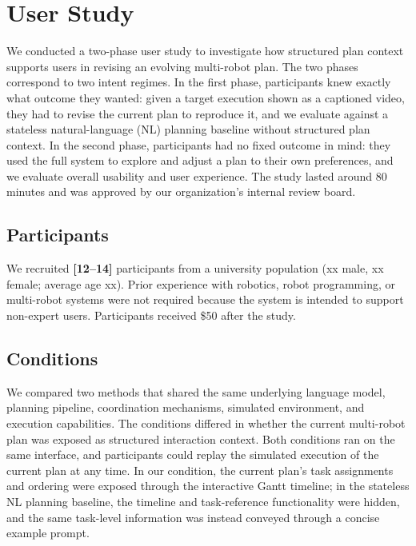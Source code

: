 \section{User Study}
\label{sec:user-study}


We conducted a two-phase user study to investigate how structured plan context supports users in revising an evolving multi-robot plan.
The two phases correspond to two intent regimes.
In the first phase, participants knew exactly what outcome they wanted: given a target execution shown as a captioned video, they had to revise the current plan to reproduce it, and we evaluate \oursystem{} against a stateless natural-language (NL) planning baseline without structured plan context.
In the second phase, participants had no fixed outcome in mind: they used the full system to explore and adjust a plan to their own preferences, and we evaluate overall usability and user experience.
The study lasted around 80 minutes and was approved by our organization's internal review board.

\subsection{Participants}

We recruited \textbf{[12--14]} participants from a university population (xx male, xx female; average age xx).
Prior experience with robotics, robot programming, or multi-robot systems were not required because the system is intended to support non-expert users.
Participants received \$50 after the study.


\subsection{Conditions}

We compared two methods that shared the same underlying language model, planning pipeline, coordination mechanisms, simulated environment, and execution capabilities.
The conditions differed in whether the current multi-robot plan was exposed as structured interaction context.
Both conditions ran on the same interface, and participants could replay the simulated execution of the current plan at any time.
In our condition, the current plan's task assignments and ordering were exposed through the interactive Gantt timeline; in the stateless NL planning baseline, the timeline and task-reference functionality were hidden, and the same task-level information was instead conveyed through a concise example prompt.

